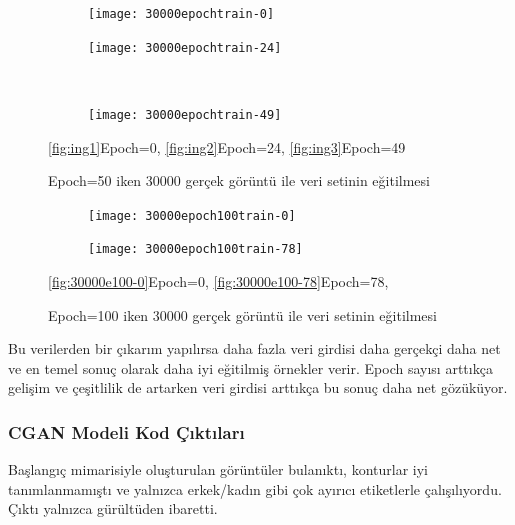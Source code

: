 \documentclass[12pt, a4paper]{article}
\begin{document}
	\begin{figure}[htbp]
		\centering
		\begin{subfigure}{0.45\textwidth}
			\centering
			\texttt{[image: 30000epochtrain-0]}
			\caption{}
			\label{fig:ing1}
		\end{subfigure}
		\hfill
		\begin{subfigure}{0.45\textwidth}
			\centering
			\texttt{[image: 30000epochtrain-24]}
			\caption{}
			\label{fig:ing2}
		\end{subfigure}
		\\
		\begin{subfigure}{0.45\textwidth}
			\centering
			\texttt{[image: 30000epochtrain-49]}
			\caption{}
			\label{fig:ing3}
		\end{subfigure}
		\caption{Epoch=50 iken 30000 gerçek görüntü ile veri setinin eğitilmesi}
		\eqref{fig:ing1}Epoch=0,
		\eqref{fig:ing2}Epoch=24,
		\eqref{fig:ing3}Epoch=49
	\end{figure}
	\begin{figure}[htbp]
		\centering
		\begin{subfigure}{0.48\textwidth}
			\centering
			\texttt{[image: 30000epoch100train-0]}
			\caption{}
			\label{fig:30000e100-0}
		\end{subfigure}
		\hfill
		\begin{subfigure}{0.48\textwidth}
			\centering
			\texttt{[image: 30000epoch100train-78]}
			\caption{}
			\label{fig:30000e100-78}
		\end{subfigure}
		\caption{Epoch=100 iken 30000 gerçek görüntü ile veri setinin eğitilmesi}
		\eqref{fig:30000e100-0}Epoch=0,
		\eqref{fig:30000e100-78}Epoch=78,
	\end{figure}
	\FloatBarrier
	
	Bu verilerden bir çıkarım yapılırsa daha fazla veri girdisi daha gerçekçi daha net ve en temel sonuç olarak daha iyi eğitilmiş örnekler verir. Epoch sayısı arttıkça gelişim ve çeşitlilik de artarken veri girdisi arttıkça bu sonuç daha net gözüküyor.
	
	\subsubsection{CGAN Modeli Kod Çıktıları}
	
	Başlangıç mimarisiyle oluşturulan görüntüler bulanıktı, konturlar iyi tanımlanmamıştı ve yalnızca erkek/kadın gibi çok ayırıcı etiketlerle çalışılıyordu. Çıktı yalnızca gürültüden ibaretti. 
	
\end{document}
